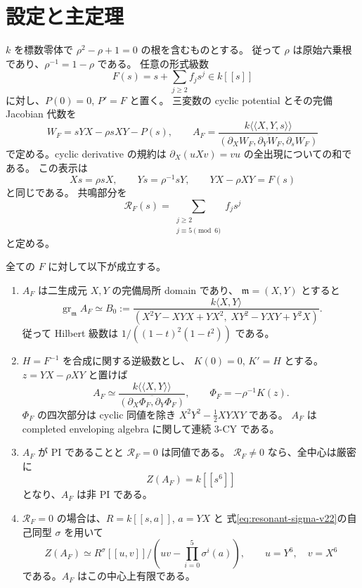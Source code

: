 \section{設定と主定理}

$k$ を標数零体で $\rho^2-\rho+1=0$ の根を含むものとする。
従って $\rho$ は原始六乗根であり、$\rho^{-1}=1-\rho$ である。
任意の形式級数
\[
 F(s)=s+\sum_{j\ge2}f_js^j\in k[[s]]
\]
に対し、$P(0)=0$, $P'=F$ と置く。
三変数の cyclic potential とその完備 Jacobian 代数を
\begin{equation}
 W_F=sYX-\rho sXY-P(s),\qquad
 A_F=\frac{k\langle\!\langle X,Y,s\rangle\!\rangle}
 {\overline{(\partial_XW_F,\partial_YW_F,\partial_sW_F)}}
 \label{eq:resonant-three-potential-v22}
\end{equation}
で定める。cyclic derivative の規約は
$\partial_X(uXv)=vu$ の全出現についての和である。
この表示は
\begin{equation}
 Xs=\rho sX,\qquad Ys=\rho^{-1}sY,\qquad
 YX-\rho XY=F(s)
 \label{eq:resonant-three-relations-v22}
\end{equation}
と同じである。
共鳴部分を
\begin{equation}
 \mathcal R_F(s)=\sum_{\substack{j\ge2\\j\equiv5\pmod6}}f_js^j
 \label{eq:resonant-part-v22}
\end{equation}
と定める。

\begin{theorem}
\label{thm:resonant-cy-pi-v22}
全ての $F$ に対して以下が成立する。
\begin{enumerate}
\item $A_F$ は二生成元 $X,Y$ の完備局所 domain であり、
      $\mathfrak m=(X,Y)$ とすると
      \[
      \operatorname{gr}_{\mathfrak m}A_F\simeq
      B_0:=\frac{k\langle X,Y\rangle}
      {(X^2Y-XYX+YX^2,\;XY^2-YXY+Y^2X)}.
      \]
      従って Hilbert 級数は $1/((1-t)^2(1-t^2))$ である。
\item $H=F^{-1}$ を合成に関する逆級数とし、
      $K(0)=0$, $K'=H$ とする。
      $z=YX-\rho XY$ と置けば
      \[
      A_F\simeq
      \frac{k\langle\!\langle X,Y\rangle\!\rangle}
      {\overline{(\partial_X\Phi_F,\partial_Y\Phi_F)}},
      \qquad \Phi_F=-\rho^{-1}K(z).
      \]
      $\Phi_F$ の四次部分は cyclic 同値を除き
      $X^2Y^2-\tfrac12XYXY$ である。
      $A_F$ は completed enveloping algebra に関して連続 $3$-CY である。
\item $A_F$ が PI であることと $\mathcal R_F=0$ は同値である。
      $\mathcal R_F\ne0$ なら、全中心は厳密に
      \[
       Z(A_F)=k[[s^6]]
      \]
      となり、$A_F$ は非 PI である。
\item $\mathcal R_F=0$ の場合は、$R=k[[s,a]]$, $a=YX$ と
      式\eqref{eq:resonant-sigma-v22}の自己同型 $\sigma$ を用いて
      \[
       Z(A_F)\simeq R^\sigma[[u,v]]/
       \left(uv-\prod_{i=0}^5\sigma^i(a)\right),
       \qquad u=Y^6,\quad v=X^6
      \]
      である。$A_F$ はこの中心上有限である。
\end{enumerate}
\end{theorem}

